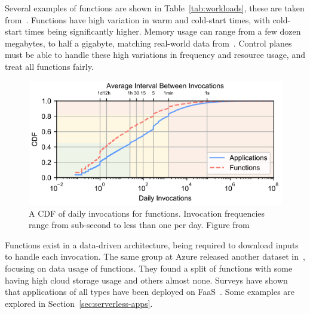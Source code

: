 Several examples of functions are shown in Table~\ref*{tab:workloads}, these are taken from~\cite{functionbench}.
Functions have high variation in warm and cold-start times, with cold-start times being significantly higher.
Memory usage can range from a few dozen megabytes, to half a gigabyte, matching real-world data from~\cite{shahrad_serverless_2020}.
Control planes must be able to handle these high variations in frequency and resource usage, and treat all functions fairly.

\begin{figure}
  \begin{center}
    \includegraphics[width=.9\columnwidth]{./figures/wild-invocations.png}
    \caption{A CDF of daily invocations for functions. 
              Invocation frequencies range from sub-second to less than one per day. 
              Figure from~\cite{shahrad_serverless_2020}}
  \label{fig:wild-invokes}
\end{center}
\end{figure}

Functions exist in a data-driven architecture, being required to download inputs to handle each invocation.
The same group at Azure released another dataset in~\cite{romero2021faa}, focusing on data usage of functions.
They found a split of functions with some having high cloud storage usage and others almost none.
Surveys have shown that applications of all types have been deployed on FaaS~\cite{raza2021sok,hossein2022survey,eismann2020serverless}.
Some examples are explored in Section~\ref{sec:serverless-apps}.


